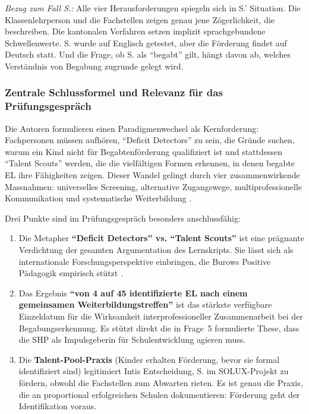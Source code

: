 \documentclass[ngerman, a4paper]{article}
\begin{document}
\textit{Bezug zum Fall S.:} Alle vier Herausforderungen spiegeln sich in
S.' Situation. Die Klassenlehrperson und die Fachstellen zeigen genau jene
Zögerlichkeit, die \textcite{gubbins2020promising} beschreiben. Die
kantonalen Verfahren setzen implizit sprachgebundene Schwellenwerte. S.
wurde auf Englisch getestet, aber die Förderung findet auf Deutsch statt.
Und die Frage, ob S. als \enquote{begabt} gilt, hängt davon ab, welches
Verständnis von Begabung zugrunde gelegt wird.

\subsubsection*{Zentrale Schlussformel und Relevanz für das
  Prüfungsgespräch}

Die Autoren formulieren einen Paradigmenwechsel als Kernforderung:
Fachpersonen müssen aufhören, \enquote{Deficit Detectors} zu sein, die
Gründe suchen, warum ein Kind nicht für Begabtenförderung qualifiziert
ist und stattdessen \enquote{Talent Scouts} werden, die die vielfältigen
Formen erkennen, in denen begabte EL ihre Fähigkeiten zeigen. Dieser
Wandel gelingt durch vier zusammenwirkende Massnahmen: universelles
Screening, alternative Zugangswege, multiprofessionelle Kommunikation und
systematische Weiterbildung \parencite[S.\,23--31]{gubbins2020promising}.

Drei Punkte sind im Prüfungsgespräch besonders anschlussfähig:

\begin{enumerate}
  \item Die Metapher \textbf{\enquote{Deficit Detectors} vs.
          \enquote{Talent Scouts}} ist eine prägnante Verdichtung der gesamten
        Argumentation des Lernskripts. Sie lässt sich als internationale
        Forschungsperspektive einbringen, die Burows Positive Pädagogik
        empirisch stützt \parencite{burow2021positive}.
  \item Das Ergebnis \textbf{\enquote{von 4 auf 45 identifizierte EL nach
            einem gemeinsamen Weiterbildungstreffen}} ist das stärkste verfügbare
        Einzeldatum für die Wirksamkeit interprofessioneller Zusammenarbeit
        bei der Begabungserkennung. Es stützt direkt die in Frage~5
        formulierte These, dass die SHP als Impulsgeberin für
        Schulentwicklung agieren muss.
  \item Die \textbf{Talent-Pool-Praxis} (Kinder erhalten Förderung, bevor
        sie formal identifiziert sind) legitimiert Intis Entscheidung, S. im
        SOLUX-Projekt zu fördern, obwohl die Fachstellen zum Abwarten rieten.
        Es ist genau die Praxis, die \textcite{gubbins2020promising} an
        proportional erfolgreichen Schulen dokumentieren: Förderung geht der
        Identifikation voraus.
\end{enumerate}
\end{document}
